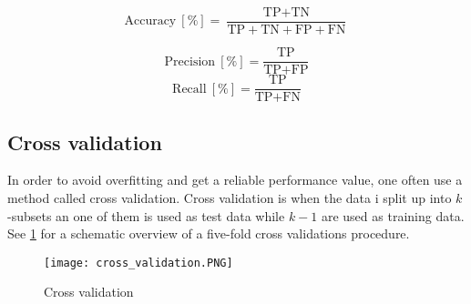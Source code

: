 \begin{equation} \label{eq:accuracy}
\text{Accuracy} \: [\%] = \frac{\text{TP} + \text{TN}}{\text{TP}+\text{TN}+\text{FP}+\text{FN}}
\end{equation}

\begin{equation} \label{eq:precision}
\text{Precision} \: [\%] = \frac{\text{TP}}{\text{TP}+\text{FP}}
\end{equation}
\begin{equation} \label{eq:recall}
\text{Recall} \: [\%] = \frac{\text{TP}}{\text{TP}+\text{FN}}
\end{equation}

\subsection{Cross validation}

In order to avoid overfitting and get a reliable performance value, one often use a method called cross validation. Cross validation is when the data i split up into $k$-subsets an one of them is used as test data while $k -1$ are used as training data. See \cref{fig:cross_validation} for a schematic overview of a five-fold cross validations procedure.  


\FloatBarrier
\begin{figure}[!h]
	\centering
	\texttt{[image: cross\_validation.PNG]}
	\caption{Cross validation
		\label{fig:cross_validation}}
\end{figure} 
\FloatBarrier
































